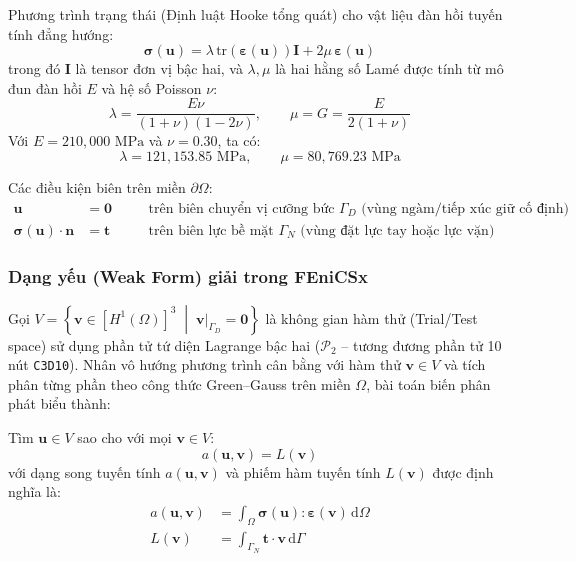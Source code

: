 \documentclass[12pt,a4paper]{article}
\begin{document}
Phương trình trạng thái (Định luật Hooke tổng quát) cho vật liệu đàn hồi tuyến tính đẳng hướng:
\begin{equation}
    \boldsymbol{\sigma}(\mathbf{u}) = \lambda\,\text{tr}(\boldsymbol{\varepsilon}(\mathbf{u}))\mathbf{I} + 2\mu\,\boldsymbol{\varepsilon}(\mathbf{u})
\end{equation}
trong đó $\mathbf{I}$ là tensor đơn vị bậc hai, và $\lambda, \mu$ là hai hằng số Lamé được tính từ mô đun đàn hồi $E$ và hệ số Poisson $\nu$:
\begin{equation}
    \lambda = \frac{E\nu}{(1 + \nu)(1 - 2\nu)}, \qquad \mu = G = \frac{E}{2(1 + \nu)}
\end{equation}
Với $E = 210,000\text{ MPa}$ và $\nu = 0.30$, ta có:
\begin{equation}
    \lambda = 121,153.85\text{ MPa}, \qquad \mu = 80,769.23\text{ MPa}
\end{equation}

Các điều kiện biên trên miền $\partial\Omega$:
\begin{align}
    \mathbf{u} &= \mathbf{0} \quad &&\text{trên biên chuyển vị cưỡng bức } \Gamma_D \text{ (vùng ngàm/tiếp xúc giữ cố định)} \\
    \boldsymbol{\sigma}(\mathbf{u}) \cdot \mathbf{n} &= \mathbf{t} \quad &&\text{trên biên lực bề mặt } \Gamma_N \text{ (vùng đặt lực tay hoặc lực vặn)}
\end{align}

\subsubsection{Dạng yếu (Weak Form) giải trong FEniCSx}
Gọi $V = \left\{ \mathbf{v} \in [H^1(\Omega)]^3 \;\middle|\; \mathbf{v}|_{\Gamma_D} = \mathbf{0} \right\}$ là không gian hàm thử (Trial/Test space) sử dụng phần tử tứ diện Lagrange bậc hai ($\mathcal{P}_2$ -- tương đương phần tử 10 nút \texttt{C3D10}). Nhân vô hướng phương trình cân bằng với hàm thử $\mathbf{v} \in V$ và tích phân từng phần theo công thức Green--Gauss trên miền $\Omega$, bài toán biến phân phát biểu thành:

Tìm $\mathbf{u} \in V$ sao cho với mọi $\mathbf{v} \in V$:
\begin{equation}
    a(\mathbf{u}, \mathbf{v}) = L(\mathbf{v})
\end{equation}
với dạng song tuyến tính $a(\mathbf{u}, \mathbf{v})$ và phiếm hàm tuyến tính $L(\mathbf{v})$ được định nghĩa là:
\begin{align}
    a(\mathbf{u}, \mathbf{v}) &= \int_{\Omega} \boldsymbol{\sigma}(\mathbf{u}) : \boldsymbol{\varepsilon}(\mathbf{v}) \, \text{d}\Omega \\
    L(\mathbf{v}) &= \int_{\Gamma_N} \mathbf{t} \cdot \mathbf{v} \, \text{d}\Gamma
\end{align}
\end{document}
